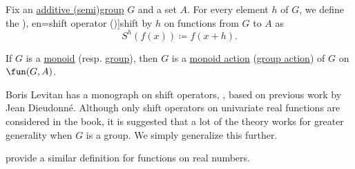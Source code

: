 \begin{definition}\label{def:shift_operator}\mimprovised
  Fix an \hyperref[def:additive_semigroup]{additive (semi)group} \( G \) and a set \( A \). For every element \( h \) of \( G \), we define the \term[ru=оператор сдвига (\cite[9]{Левитан1973ТеорияОператоровОбобщенногоСдвига}), en=shift operator (\cite{Stanley2012EnumerativeCombinatoricsVol1})]{shift} by \( h \) on functions from \( G \) to \( A \) as
  \begin{equation}\label{eq:def:shift_operator}
    S^h(f(x)) \coloneqq f(x + h).
  \end{equation}
\end{definition}
\begin{comments}
  \item If \( G \) is a \hyperref[def:semigroup]{monoid} (resp. \hyperref[def:group]{group}), then \( G \) is a \hyperref[def:monoid_action]{monoid action} (\hyperref[def:group_action]{group action}) of \( G \) on \( \fun(G, A) \).

  \item Boris Levitan has a monograph on shift operators, \cite{Левитан1973ТеорияОператоровОбобщенногоСдвига}, based on previous work by Jean Dieudonné. Although only shift operators on univariate real functions are considered in the book, it is suggested that a lot of the theory works for greater generality when \( G \) is a group. We simply generalize this further.

  \textcite[12]{LevyLessman1961FiniteDifferenceEquations} provide a similar definition for functions on real numbers.
\end{comments}

